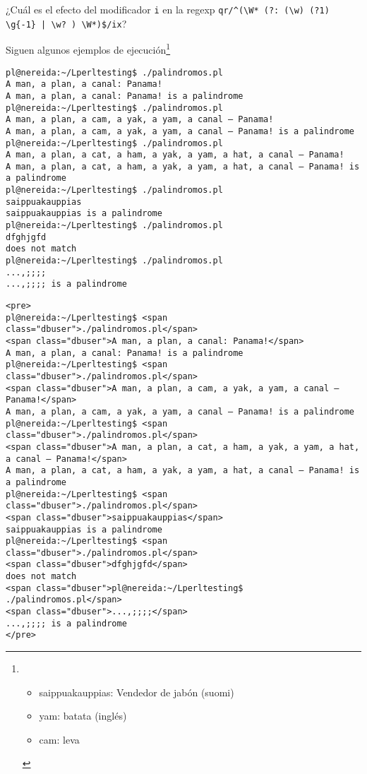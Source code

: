 \begin{exercise}
¿Cuál es el efecto del modificador \verb|i|
en la regexp \verb#qr/^(\W* (?: (\w) (?1) \g{-1} | \w? ) \W*)$/ix#?
\end{exercise}


Siguen algunos ejemplos de ejecución\footnote{
\begin{itemize}
\item saippuakauppias: Vendedor de jabón (suomi)
\item yam: batata (inglés)
\item cam: leva
\end{itemize}
}
\begin{latexonly}
\begin{verbatim}
pl@nereida:~/Lperltesting$ ./palindromos.pl
A man, a plan, a canal: Panama!
A man, a plan, a canal: Panama! is a palindrome
pl@nereida:~/Lperltesting$ ./palindromos.pl
A man, a plan, a cam, a yak, a yam, a canal – Panama!
A man, a plan, a cam, a yak, a yam, a canal – Panama! is a palindrome
pl@nereida:~/Lperltesting$ ./palindromos.pl
A man, a plan, a cat, a ham, a yak, a yam, a hat, a canal – Panama!
A man, a plan, a cat, a ham, a yak, a yam, a hat, a canal – Panama! is a palindrome
pl@nereida:~/Lperltesting$ ./palindromos.pl
saippuakauppias
saippuakauppias is a palindrome
pl@nereida:~/Lperltesting$ ./palindromos.pl
dfghjgfd
does not match
pl@nereida:~/Lperltesting$ ./palindromos.pl
...,;;;;
...,;;;; is a palindrome
\end{verbatim}
\end{latexonly}
\begin{verbatim}
<pre>
pl@nereida:~/Lperltesting$ <span class="dbuser">./palindromos.pl</span>
<span class="dbuser">A man, a plan, a canal: Panama!</span>
A man, a plan, a canal: Panama! is a palindrome
pl@nereida:~/Lperltesting$ <span class="dbuser">./palindromos.pl</span>
<span class="dbuser">A man, a plan, a cam, a yak, a yam, a canal – Panama!</span>
A man, a plan, a cam, a yak, a yam, a canal – Panama! is a palindrome
pl@nereida:~/Lperltesting$ <span class="dbuser">./palindromos.pl</span>
<span class="dbuser">A man, a plan, a cat, a ham, a yak, a yam, a hat, a canal – Panama!</span>
A man, a plan, a cat, a ham, a yak, a yam, a hat, a canal – Panama! is a palindrome
pl@nereida:~/Lperltesting$ <span class="dbuser">./palindromos.pl</span>
<span class="dbuser">saippuakauppias</span>
saippuakauppias is a palindrome
pl@nereida:~/Lperltesting$ <span class="dbuser">./palindromos.pl</span>
<span class="dbuser">dfghjgfd</span>
does not match
<span class="dbuser">pl@nereida:~/Lperltesting$ ./palindromos.pl</span>
<span class="dbuser">...,;;;;</span>
...,;;;; is a palindrome
</pre>
\end{verbatim}

